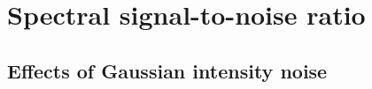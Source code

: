 





\section{Spectral signal-to-noise ratio}
\label{sec:spectralSNR}

\subsection{Effects of Gaussian intensity noise}

